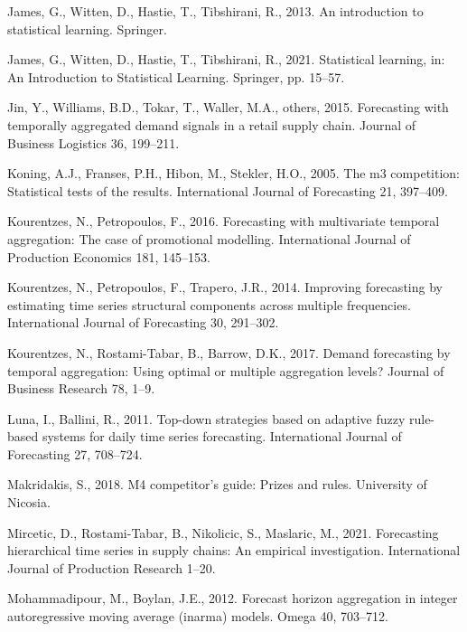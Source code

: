 \documentclass[]{elsarticle} %
\begin{document}
\leavevmode\hypertarget{ref-james2013introduction}{}%
James, G., Witten, D., Hastie, T., Tibshirani, R., 2013. An introduction
to statistical learning. Springer.

\leavevmode\hypertarget{ref-james2021statistical}{}%
James, G., Witten, D., Hastie, T., Tibshirani, R., 2021. Statistical
learning, in: An Introduction to Statistical Learning. Springer, pp.
15--57.

\leavevmode\hypertarget{ref-jin2015forecasting}{}%
Jin, Y., Williams, B.D., Tokar, T., Waller, M.A., others, 2015.
Forecasting with temporally aggregated demand signals in a retail supply
chain. Journal of Business Logistics 36, 199--211.

\leavevmode\hypertarget{ref-MCB}{}%
Koning, A.J., Franses, P.H., Hibon, M., Stekler, H.O., 2005. The m3
competition: Statistical tests of the results. International Journal of
Forecasting 21, 397--409.

\leavevmode\hypertarget{ref-kourentzes2015forecasting}{}%
Kourentzes, N., Petropoulos, F., 2016. Forecasting with multivariate
temporal aggregation: The case of promotional modelling. International
Journal of Production Economics 181, 145--153.

\leavevmode\hypertarget{ref-kourentzes2014improving}{}%
Kourentzes, N., Petropoulos, F., Trapero, J.R., 2014. Improving
forecasting by estimating time series structural components across
multiple frequencies. International Journal of Forecasting 30, 291--302.

\leavevmode\hypertarget{ref-kourentzes2017demand}{}%
Kourentzes, N., Rostami-Tabar, B., Barrow, D.K., 2017. Demand
forecasting by temporal aggregation: Using optimal or multiple
aggregation levels? Journal of Business Research 78, 1--9.

\leavevmode\hypertarget{ref-luna2011top}{}%
Luna, I., Ballini, R., 2011. Top-down strategies based on adaptive fuzzy
rule-based systems for daily time series forecasting. International
Journal of Forecasting 27, 708--724.

\leavevmode\hypertarget{ref-Makridakis2018}{}%
Makridakis, S., 2018. M4 competitor's guide: Prizes and rules.
University of Nicosia.

\leavevmode\hypertarget{ref-mircetic2021forecasting}{}%
Mircetic, D., Rostami-Tabar, B., Nikolicic, S., Maslaric, M., 2021.
Forecasting hierarchical time series in supply chains: An empirical
investigation. International Journal of Production Research 1--20.

\leavevmode\hypertarget{ref-mohammadipour2012forecast}{}%
Mohammadipour, M., Boylan, J.E., 2012. Forecast horizon aggregation in
integer autoregressive moving average (inarma) models. Omega 40,
703--712.
\end{document}
